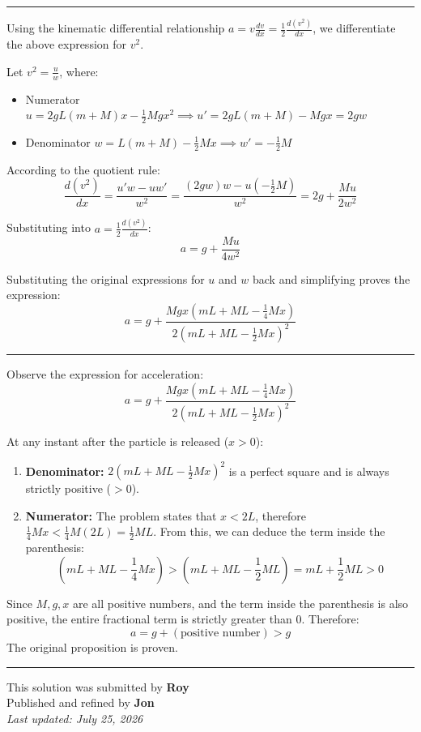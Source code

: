 \documentclass[12pt]{article}
\begin{document}
\noindent\rule{\textwidth}{0.4pt}


Using the kinematic differential relationship $a = v\frac{dv}{dx} = \frac{1}{2}\frac{d(v^2)}{dx}$, we differentiate the above expression for $v^2$.

Let $v^2 = \frac{u}{w}$, where:
\begin{itemize}
    \item Numerator $u = 2gL(m+M)x - \frac{1}{2}Mgx^2 \implies u' = 2gL(m+M) - Mgx = 2gw$
    \item Denominator $w = L(m+M) - \frac{1}{2}Mx \implies w' = -\frac{1}{2}M$
\end{itemize}

According to the quotient rule:
\[ \frac{d(v^2)}{dx} = \frac{u'w - uw'}{w^2} = \frac{(2gw)w - u(-\frac{1}{2}M)}{w^2} = 2g + \frac{Mu}{2w^2} \]

Substituting into $a = \frac{1}{2}\frac{d(v^2)}{dx}$:
\[ a = g + \frac{Mu}{4w^2} \]

Substituting the original expressions for $u$ and $w$ back and simplifying proves the expression:
\[ a = g + \frac{Mgx(mL + ML - \frac{1}{4}Mx)}{2\left(mL + ML - \frac{1}{2}Mx\right)^2} \]

\noindent\rule{\textwidth}{0.4pt}

Observe the expression for acceleration:
\[ a = g + \frac{Mgx(mL + ML - \frac{1}{4}Mx)}{2\left(mL + ML - \frac{1}{2}Mx\right)^2} \]

At any instant after the particle is released ($x > 0$):
\begin{enumerate}
    \item \textbf{Denominator:} $2\left(mL + ML - \frac{1}{2}Mx\right)^2$ is a perfect square and is always strictly positive ($> 0$).
    \item \textbf{Numerator:} The problem states that $x < 2L$, therefore $\frac{1}{4}Mx < \frac{1}{4}M(2L) = \frac{1}{2}ML$.
    From this, we can deduce the term inside the parenthesis:
    \[ (mL + ML - \frac{1}{4}Mx) > \left(mL + ML - \frac{1}{2}ML\right) = mL + \frac{1}{2}ML > 0 \]
\end{enumerate}

Since $M, g, x$ are all positive numbers, and the term inside the parenthesis is also positive, the entire fractional term is strictly greater than $0$. Therefore:
\[ a = g + (\text{positive number}) > g \]
The original proposition is proven.

\bigskip
\hrule
\begin{center}
    This solution was submitted by \textbf{Roy}\\[4pt]
    Published and refined by \textbf{Jon}\\[8pt]
    \textit{Last updated: July 25, 2026}
\end{center}
\end{document}
